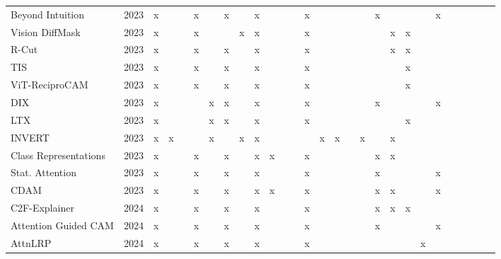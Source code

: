 \begin{tabular}{ll|cc|ccc|cc|cccc|ccccc|ccccc|ccccc}
\addlinespace
Beyond Intuition \cite{chenIntuitionRethinkingToken2023} & 2023 & x &  &  & x &  & x &  & x &  &  &  & x &  &  &  &  & x &  &  &  & x &  &  &  &  &  \\
Vision DiffMask \cite{nalmpantisVisionDiffMaskFaithful2023} & 2023 & x &  &  & x &  &  & x & x &  &  &  & x &  &  &  &  &  & x & x &  &  &  &  &  &  &  \\
R-Cut \cite{niuRCutEnhancingExplainability2024} & 2023 & x &  &  & x &  & x &  & x &  &  &  & x &  &  &  &  &  & x & x &  &  &  &  &  &  &  \\
TIS \cite{englebertExplainingTransformerInput2023} & 2023 & x &  &  & x &  & x &  & x &  &  &  & x &  &  &  &  &  &  & x &  &  &  &  &  &  &  \\
ViT-ReciproCAM \cite{byunViTReciproCAMGradientAttentionFree2023} & 2023 & x &  &  & x &  & x &  & x &  &  &  & x &  &  &  &  &  &  & x &  &  &  &  &  &  &  \\
DIX \cite{barkanDeepIntegratedExplanations2023} & 2023 & x &  &  &  & x & x &  & x &  &  &  & x &  &  &  &  & x &  &  &  & x &  &  &  &  &  \\
LTX \cite{barkanLearningExplainModelAgnostic2023} & 2023 & x &  &  &  & x & x &  & x &  &  &  & x &  &  &  &  &  &  & x &  &  &  &  &  &  &  \\
INVERT \cite{bykovLabelingNeuralRepresentations2023} & 2023 & x & x &  &  & x &  & x & x &  &  &  &  & x & x &  & x &  & x &  &  &  &  &  &  &  &  \\
Class Representations \cite{vilasAnalyzingVisionTransformers2023} & 2023 & x &  &  & x &  & x &  & x & x &  &  & x &  &  &  &  & x & x &  &  &  &  &  &  &  &  \\
Stat. Attention \cite{nguyenInspectingExplainabilityTransformer2023} & 2023 & x &  &  & x &  & x &  & x &  &  &  & x &  &  &  &  & x &  &  &  & x &  &  &  &  &  \\
CDAM \cite{brockiClassDiscriminativeAttentionMaps2023} & 2023 & x &  &  & x &  & x &  & x & x &  &  & x &  &  &  &  & x & x &  &  & x &  &  &  &  &  \\
\addlinespace
C2F-Explainer \cite{dingC2FExplainerExplainingTransformers2024} & 2024 & x &  &  & x &  & x &  & x &  &  &  & x &  &  &  &  & x & x & x &  &  &  &  &  &  &  \\
Attention Guided CAM \cite{leemAttentionGuidedCAM2024} & 2024 & x &  &  & x &  & x &  & x &  &  &  & x &  &  &  &  & x &  &  &  & x &  &  &  &  &  \\
AttnLRP \cite{achtibatAttnLRPAttentionAwareLayerwise2024} & 2024 & x &  &  & x &  & x &  & x &  &  &  & x &  &  &  &  &  &  &  & x &  &  &  &  &  &  \\

\end{tabular}
